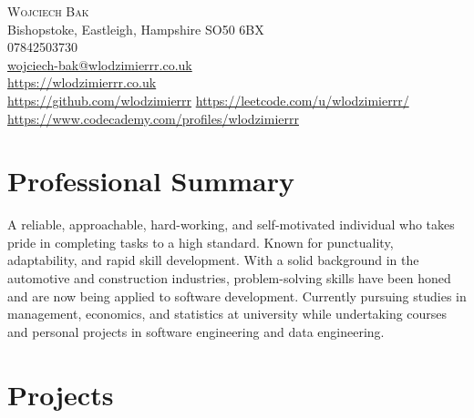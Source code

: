 \documentclass[a4paper,10pt]{article}
\begin{document}
\begin{center}
    {\LARGE \textsc{Wojciech Bak}} \\
    Bishopstoke, Eastleigh, Hampshire SO50 6BX \\
    07842503730 \\
    \href{mailto:wojciech-bak@wlodzimierrr.co.uk}{wojciech-bak@wlodzimierrr.co.uk} \\
    \href{https://wlodzimierrr.co.uk}{https://wlodzimierrr.co.uk} \\
    \href{https://github.com/wlodzimierrr}{https://github.com/wlodzimierrr} \quad
    \href{https://leetcode.com/u/wlodzimierrr/}{https://leetcode.com/u/wlodzimierrr/} \quad
    \href{https://www.codecademy.com/profiles/wlodzimierrr}{https://www.codecademy.com/profiles/wlodzimierrr}
\end{center}

\section*{Professional Summary}
A reliable, approachable, hard-working, and self-motivated individual who takes pride in completing tasks to a high standard. Known for punctuality, adaptability, and rapid skill development. With a solid background in the automotive and construction industries, problem-solving skills have been honed and are now being applied to software development. Currently pursuing studies in management, economics, and statistics at university while undertaking courses and personal projects in software engineering and data engineering.

\section*{Projects}
\end{document}
